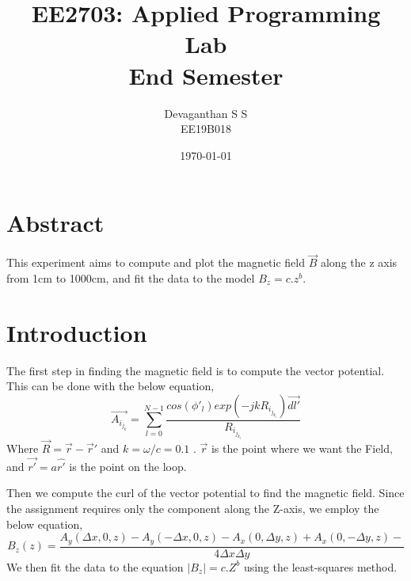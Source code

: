 \documentclass[12pt, a4paper]{report}
\title{\textbf{EE2703: Applied Programming Lab\\End Semester
}}
\author{Devaganthan S S\\ EE19B018}
\date{\today}
\begin{document}
\maketitle


\section{Abstract}
This experiment aims to compute and plot the magnetic field $\overrightarrow{B}$ along the z axis from 1cm to 1000cm, and fit the data to the model $B_z= c.z^b$. 

\section{Introduction}
The first step in finding the magnetic field is to compute the vector potential. This can be done with the below equation,
\begin{equation}
    \overrightarrow{A_i_j_k} = \sum_{l=0}^{N-1} \frac{cos(\phi'_l )exp(-jkR_i_j_k_l)\overrightarrow{dl'}}{R_i_j_k_l}
\end{equation}
Where $\overrightarrow{R} = \vec{r} - \overrightarrow{r}'$ and $k = \omega/c = 0.1$ . $\overrightarrow{r}$ is the point where we want the Field, and $\overrightarrow{r'} = a\hat{r'}$ is the point on the loop.

Then we compute the curl of the vector potential to find the magnetic field. Since the assignment requires only the component along the Z-axis, we employ the below equation,
\begin{equation}
    B_z(z) = \frac{A_y(\Delta x,0,z)-A_y(-\Delta x,0,z)-A_x(0,\Delta y,z)+A_x(0,-\Delta y,z)-}{4\Delta x\Delta y}
\end{equation}
We then fit the data to the equation $|B_z| = c.Z^b$ using the least-squares method.
\end{document}
